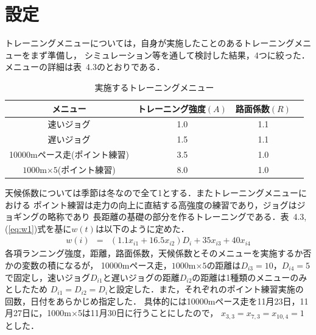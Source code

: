 \documentclass[12pt,fleqn]{jreport}
\begin{document}
\section{設定}
\vspace{1cm}
トレーニングメニューについては，自身が実施したことのあるトレーニングメニューをまず準備し，
シミュレーション等を通して検討した結果，4つに絞った．メニューの詳細は表\ 4.3のとおりである．
\newpage
\begin{longtable}{|c|c|c|c|}
  \caption{実施するトレーニングメニュー}                                   \\
  \hline
  メニュー                         & トレーニング強度$(A)$ & 路面係数$(R)$ \\
  \hline
  速いジョグ                       & 1.0                   & 1.1           \\
  \hline
  遅いジョグ                       & 1.5                   & 1.1           \\
  \hline
  10000mペース走(ポイント練習)     & 3.5                   & 1.0           \\
  \hline
  $1000$m$ \times 5$(ポイント練習) & 8.0                   & 1.0           \\
  \hline
\end{longtable}
天候係数については季節は冬なので全て1とする．またトレーニングメニューにおける
ポイント練習は走力の向上に直結する高強度の練習であり，ジョグはジョギングの略称であり
長距離の基礎の部分を作るトレーニングである．表\ 4.3,(\ref{eq:w1})式を基に$w(t)$は以下のように定めた．
\begin{eqnarray}
  w(i)&=&(1.1x_{i1}+16.5x_{i2})D_{i}+35x_{i3}+40x_{i4}\label{eq:w3}
\end{eqnarray}
各項ランニング強度，距離，路面係数，天候係数とそのメニューを実施するか否かの変数の積になるが，
10000mペース走，$1000$m$\times 5$の距離は$D_{i3}=10$，$D_{i4}=5$で固定し，速いジョグ$D_{i1}$と遅いジョグの距離$D_{i2}$の距離は1種類のメニューのみとしたため
$D_{i1}=D_{i2}=D_i$と設定した．また，それぞれのポイント練習実施の回数，日付をあらかじめ指定した．
具体的には10000mペース走を11月23日，11月27日に，1000m$\times$5は11月30日に行うことにしたので，
$x_{3,3}=x_{7,3}=x_{10,4}=1$とした．
\end{document}
